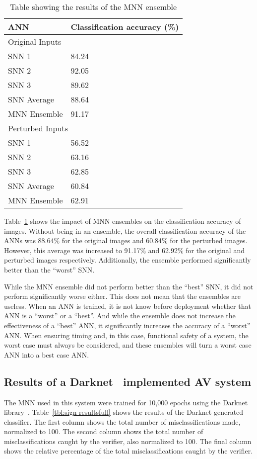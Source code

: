 \begin{table}[h]
	\centering
	\caption{Table showing the results of the \ac{MNN} ensemble}
	\label{tbl:sign-enemble}
	\begin{tabular}{|l||l|}
		\hline
		\ac{ANN} & Classification accuracy (\%) \\ \hline
		\multicolumn{2}{|l|}{Original Inputs} \\ \hline
		\ac{SNN} 1 & 84.24 \\ 
		\ac{SNN} 2 & 92.05 \\ 
		\ac{SNN} 3 & 89.62 \\ 
		\ac{SNN} Average & 88.64 \\
		\ac{MNN} Ensemble & 91.17 \\ 
		\hline
		\multicolumn{2}{|l|}{Perturbed Inputs} \\ \hline
		\ac{SNN} 1 & 56.52 \\ 
		\ac{SNN} 2 & 63.16 \\ 
		\ac{SNN} 3 & 62.85 \\ 
		\ac{SNN} Average & 60.84 \\
		\ac{MNN} Ensemble & 62.91 \\ 
		\hline
	\end{tabular}%
\end{table}

Table~\ref{tbl:sign-enemble} shows the impact of \ac{MNN} ensembles on the classification accuracy of images.
Without being in an ensemble, the overall classification accuracy of the \acp{ANN} was 88.64\% for the original images and 60.84\% for the perturbed images.
However, this average was increased to 91.17\% and 62.92\% for the original and perturbed images respectively.
Additionally, the ensemble performed significantly better than the ``worst'' \ac{SNN}.

While the \ac{MNN} ensemble did not perform better than the ``best'' \ac{SNN}, it did not perform significantly worse either.
This does not mean that the ensembles are useless.
When an \ac{ANN} is trained, it is not know before deployment whether that \ac{ANN} is a ``worst'' or a ``best''.
And while the ensemble does not increase the effectiveness of a ``best'' \ac{ANN}, it significantly increases the accuracy of a ``worst'' \ac{ANN}.
When ensuring timing and, in this case, functional safety of a system, the worst case must always be considered, and these ensembles will turn a worst case \ac{ANN} into a best case \ac{ANN}.

\subsection{Results of a Darknet~\cite{darknet13} implemented \ac{AV} system}
The \ac{MNN} used in this system were trained for 10,000 epochs using the Darknet library~\cite{darknet13}.
Table~\ref{tbl:sign-resultsfull} shows the results of the Darknet generated classifier.
The first column shows the total number of misclassifications made, normalized to 100.
The second column shows the total number of misclassifications caught by the verifier, also normalized to 100.
The final column shows the relative percentage of the total misclassifications caught by the verifier.

